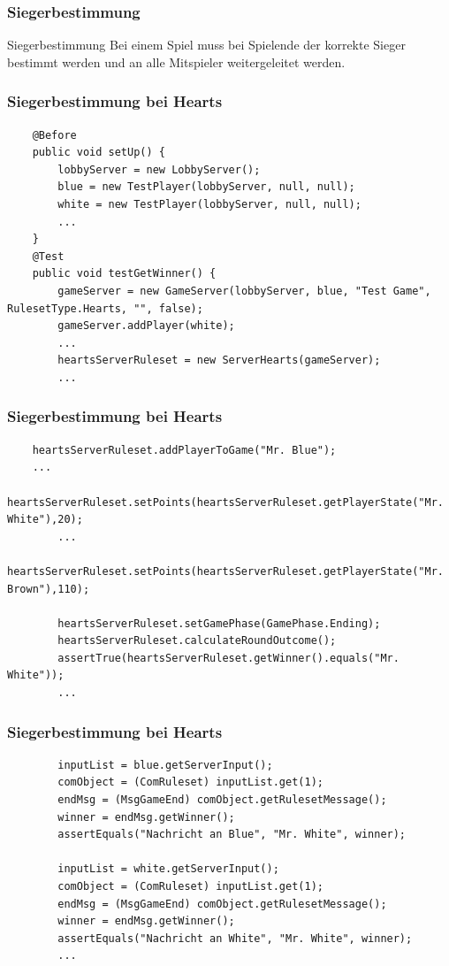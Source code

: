 \documentclass{beamer}
\begin{document}
\begin{frame}
\frametitle{Siegerbestimmung}
	\begin{block}
		{Siegerbestimmung} Bei einem Spiel muss bei Spielende der korrekte Sieger bestimmt werden und an alle Mitspieler weitergeleitet werden.
	\end{block}
\end{frame}


\begin{frame}[fragile]
\frametitle{Siegerbestimmung bei Hearts}
\begin{lstlisting}
	@Before
	public void setUp() {
		lobbyServer = new LobbyServer();
		blue = new TestPlayer(lobbyServer, null, null);
		white = new TestPlayer(lobbyServer, null, null);
		...
	}
	@Test
	public void testGetWinner() {		
		gameServer = new GameServer(lobbyServer, blue, "Test Game", 		  RulesetType.Hearts, "", false);
		gameServer.addPlayer(white);
		...		
		heartsServerRuleset = new ServerHearts(gameServer);
		...
\end{lstlisting}
\end{frame}


\begin{frame}[fragile]
\frametitle{Siegerbestimmung bei Hearts}
\begin{lstlisting}
	heartsServerRuleset.addPlayerToGame("Mr. Blue");
	...
		heartsServerRuleset.setPoints(heartsServerRuleset.getPlayerState("Mr. White"),20);
		...
		heartsServerRuleset.setPoints(heartsServerRuleset.getPlayerState("Mr. Brown"),110);
		
		heartsServerRuleset.setGamePhase(GamePhase.Ending);
		heartsServerRuleset.calculateRoundOutcome();		
		assertTrue(heartsServerRuleset.getWinner().equals("Mr. White"));		
		...
\end{lstlisting}
\end{frame}



\begin{frame}[fragile]
\frametitle{Siegerbestimmung bei Hearts}
\begin{lstlisting}
		inputList = blue.getServerInput();
		comObject = (ComRuleset) inputList.get(1);
		endMsg = (MsgGameEnd) comObject.getRulesetMessage();
		winner = endMsg.getWinner();
		assertEquals("Nachricht an Blue", "Mr. White", winner);

		inputList = white.getServerInput();
		comObject = (ComRuleset) inputList.get(1);
		endMsg = (MsgGameEnd) comObject.getRulesetMessage();
		winner = endMsg.getWinner();
		assertEquals("Nachricht an White", "Mr. White", winner);
		...
\end{lstlisting}
\end{frame}
\end{document}
